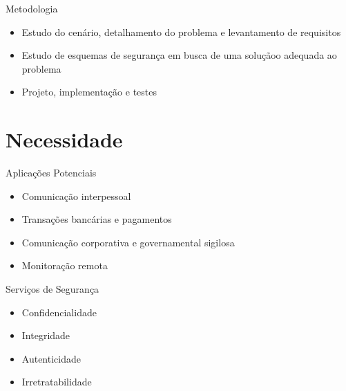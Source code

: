 \documentclass[notes,blue,mathserif]{beamer}
\begin{document}
\begin{frame}{Metodologia}
\begin{itemize}[<+->]
\item Estudo do cen\'{a}rio, detalhamento do problema e levantamento de requisitos
\item Estudo de esquemas de segurança em busca de uma solu\c{c}\~{a}oo adequada ao problema
\item Projeto, implementa\c{c}\~{a}o e testes
\end{itemize}
\end{frame}

\section{Necessidade}


\begin{frame}{Aplica\c{c}\~{o}es Potenciais}
\begin{itemize}[<+->]
\item Comunica\c{c}\~{a}o interpessoal
\item Transa\c{c}\~{o}es banc\'{a}rias e pagamentos
\item Comunica\c{c}\~{a}o corporativa e governamental sigilosa
\item Monitora\c{c}\~{a}o remota
\end{itemize}
\end{frame}


\begin{frame}{Servi\c{c}os de Seguran\c{c}a}
\begin{itemize}[<+->]
\item Confidencialidade
\item Integridade
\item Autenticidade
\item Irretratabilidade
\end{itemize}
\end{frame}

\end{document}
